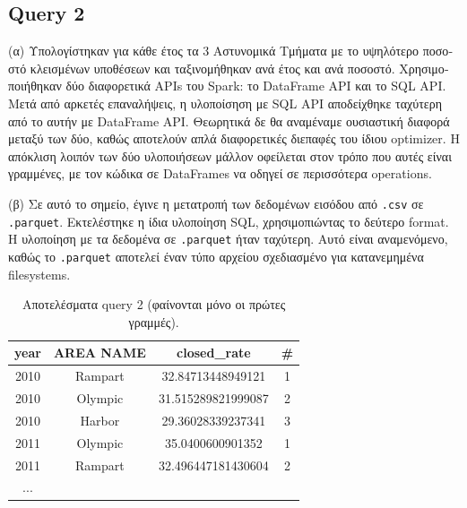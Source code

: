 \documentclass[a4paper,12pt]{article}
\begin{document}
\begin{otherlanguage}{greek}
\section*{Query 2}
	\FloatBarrier
	\par{(α)} Υπολογίστηκαν για κάθε έτος τα 3 Αστυνομικά Τμήματα με το υψηλότερο
	ποσοστό κλεισμένων υποθέσεων και ταξινομήθηκαν ανά έτος και ανά ποσοστό.
	Χρησιμοποιήθηκαν δύο διαφορετικά APIs του Spark: το DataFrame API και το SQL
	API. Μετά από αρκετές επαναλήψεις, η υλοποίσηση με SQL API αποδείχθηκε 
	ταχύτερη από το αυτήν με DataFrame API. Θεωρητικά δε θα αναμέναμε ουσιαστική
	διαφορά μεταξύ των δύο, καθώς αποτελούν απλά διαφορετικές διεπαφές του ίδιου
	optimizer. Η απόκλιση λοιπόν των δύο υλοποιήσεων μάλλον οφείλεται στον τρόπο
	που αυτές είναι γραμμένες, με τον κώδικα σε DataFrames να οδηγεί σε περισσότερα
	operations.
	\par{(β)} Σε αυτό το σημείο, έγινε η μετατροπή των δεδομένων εισόδου από 
	\texttt{.csv} σε \texttt{.parquet}. Εκτελέστηκε η ίδια υλοποίηση SQL,
	χρησιμοπιώντας το δεύτερο format. Η υλοποίηση με τα δεδομένα σε
	\texttt{.parquet} ήταν ταχύτερη. Αυτό είναι αναμενόμενο, καθώς το 
	\texttt{.parquet} αποτελεί έναν τύπο αρχείου σχεδιασμένο για κατανεμημένα
	filesystems.
	\begin{table}[h]
		\centering
		\begin{tabular}{cccc}
			year & AREA NAME & closed\_rate & \# \\
			\hline
			2010 & Rampart & 32.84713448949121 & 1 \\
			2010 & Olympic & 31.515289821999087 & 2 \\
			2010 & Harbor & 29.36028339237341 & 3 \\
			2011 & Olympic & 35.0400600901352 & 1 \\
			2011 & Rampart & 32.496447181430604 & 2 \\
			...
		\end{tabular}
		\caption{Aποτελέσματα query 2 (φαίνονται μόνο οι 
		πρώτες γραμμές).}
	\end{table}
	\FloatBarrier


\end{otherlanguage}
\end{document}
